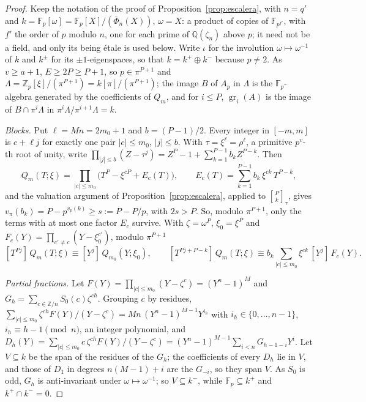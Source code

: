 \documentclass[11pt,a4paper]{article}
\theoremstyle{definition}
\newcommand{\ZZ}{\mathbb{Z}}
\newcommand{\QQ}{\mathbb{Q}}
\newcommand{\FF}{\mathbb{F}}
\newcommand{\gr}{\operatorname{gr}}
\begin{document}
\begin{proof}
Keep the notation of the proof of Proposition~\ref{prop:escalera}, with $n=q'$ and
$k=\FF_p[\omega]=\FF_p[X]/(\overline\Phi_n(X))$, $\omega=X$: a product of copies of $\FF_{p^{f'}}$, with $f'$ the order
of $p$ modulo $n$, one for each prime of $\QQ(\zeta_n)$ above $p$; it need not be a field, and only its being étale
is used below. Write $\iota$ for the involution $\omega\mapsto\omega^{-1}$ of $k$ and $k^\pm$ for its
$\pm1$-eigenspaces, so that $k=k^+\oplus k^-$ because $p\neq2$. As $v\ge a+1$,
$E\ge2P\ge P+1$, so $p\in\pi^{P+1}$ and $\Lambda=\ZZ_p[\xi]/(\pi^{P+1})=k[\pi]/(\pi^{P+1})$; the image $B$ of $A_p$ in
$\Lambda$ is the $\FF_p$-algebra generated by the coefficients of $Q_m$, and for $i\le P$, $\gr_i(A)$ is the image of
$B\cap\pi^i\Lambda$ in $\pi^i\Lambda/\pi^{i+1}\Lambda=k$.

\emph{Blocks.} Put $\ell=Mn=2m_0+1$ and $b=(P-1)/2$. Every integer in $[-m,m]$ is $c+\ell j$ for exactly one pair
$|c|\le m_0$, $|j|\le b$. With $\tau=\xi^\ell=\rho^\ell$, a primitive $p^v$-th root of unity, write
$\prod_{|j|\le b}(Z-\tau^j)=Z^P-1+\sum_{k=1}^{P-1}b_kZ^{P-k}$. Then
\begin{equation}\label{eq:bloques}
Q_m(T;\xi)=\prod_{|c|\le m_0}\bigl(T^P-\xi^{cP}+E_c(T)\bigr),\qquad E_c(T)=\sum_{k=1}^{P-1}b_k\,\xi^{ck}\,T^{P-k},
\end{equation}
and the valuation argument of Proposition~\ref{prop:escalera}, applied to $\genfrac{[}{]}{0pt}{}{P}{k}_\tau$, gives
$v_\pi(b_k)=P-p^{v_p(k)}\ge s:=P-P/p$, with $2s>P$. So, modulo $\pi^{P+1}$, only the terms with at most one factor $E_c$
survive. With $\zeta=\omega^P$, $\xi_0=\xi^P$ and $F_c(Y)=\prod_{c'\ne c}(Y-\xi_0^{c'})$,
modulo $\pi^{P+1}$
\[
[T^{Pj}]\,Q_m(T;\xi)\equiv[Y^j]\,Q_{m_0}(Y;\xi_0),\qquad
[T^{Pj+P-k}]\,Q_m(T;\xi)\equiv b_k\sum_{|c|\le m_0}\xi^{ck}\,[Y^j]\,F_c(Y).
\]

\emph{Partial fractions.} Let $F(Y)=\prod_{|c|\le m_0}(Y-\zeta^c)=(Y^n-1)^M$ and $G_h=\sum_{c\in\ZZ/n}S_0(c)\zeta^{ch}$.
Grouping $c$ by residues, $\sum_{|c|\le m_0}\zeta^{ch}F(Y)/(Y-\zeta^c)=Mn\,(Y^n-1)^{M-1}Y^{i_h}$ with $i_h\in\{0,\dots,n-1\}$, $i_h\equiv h-1\pmod n$,
an integer polynomial, and $D_h(Y)=\sum_{|c|\le m_0}c\,\zeta^{ch}F(Y)/(Y-\zeta^c)=(Y^n-1)^{M-1}\sum_{i<n}G_{h-1-i}Y^i$.
Let $V\subseteq k$ be the span of the residues of the $G_h$; the coefficients of every $D_h$ lie in $V$, and those of
$D_1$ in degrees $n(M-1)+i$ are the $G_{-i}$, so they span $V$. As $S_0$ is odd, $G_h$ is anti-invariant under
$\omega\mapsto\omega^{-1}$; so $V\subseteq k^-$, while $\FF_p\subseteq k^+$ and $k^+\cap k^-=0$.


\end{proof}
\end{document}
